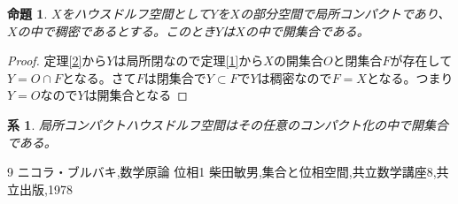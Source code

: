 \documentclass[leqno]{jsarticle}
\newtheorem{prop}[thm]{命題}
\newtheorem{cor}[thm]{系}
\begin{document}
\begin{prop}
$X$をハウスドルフ空間として$Y$を$X$の部分空間で局所コンパクトであり、$X$の中で稠密であるとする。このとき$Y$は$X$の中で開集合である。
\end{prop}
\begin{proof}
定理\ref{2}から$Y$は局所閉なので定理\ref{1}から$X$の開集合$O$と閉集合$F$が存在して$Y=O\cap F$となる。さて$F$は閉集合で$Y\subset F$で$Y$は稠密なので$F=X$となる。つまり$Y=O$なので$Y$は開集合となる

\end{proof}

\begin{cor}
局所コンパクトハウスドルフ空間はその任意のコンパクト化の中で開集合である。
\end{cor}








































\begin{thebibliography}{9}
ニコラ・ブルバキ,数学原論 位相1
柴田敏男,集合と位相空間,共立数学講座8,共立出版,1978
\end{thebibliography}

			
\end{document}
